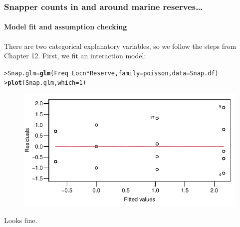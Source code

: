 \documentclass{beamer}\usepackage[]{graphicx}\usepackage[]{xcolor}
\makeatletter
\newcommand{\hlnum}[1]{\textcolor[rgb]{0.686,0.059,0.569}{#1}}%
\newcommand{\hlopt}[1]{\textcolor[rgb]{0,0,0}{#1}}%
\newcommand{\hlstd}[1]{\textcolor[rgb]{0.345,0.345,0.345}{#1}}%
\newcommand{\hlkwb}[1]{\textcolor[rgb]{0.69,0.353,0.396}{#1}}%
\newcommand{\hlkwc}[1]{\textcolor[rgb]{0.333,0.667,0.333}{#1}}%
\newcommand{\hlkwd}[1]{\textcolor[rgb]{0.737,0.353,0.396}{\textbf{#1}}}%
\newenvironment{kframe}{%
 \def\at@end@of@kframe{}%
 \ifinner\ifhmode%
  \def\at@end@of@kframe{\end{minipage}}%
  \begin{minipage}{\columnwidth}%
 \fi\fi%
 \def\FrameCommand##1{\hskip\@totalleftmargin \hskip-\fboxsep
 \colorbox{shadecolor}{##1}\hskip-\fboxsep
     \hskip-\linewidth \hskip-\@totalleftmargin \hskip\columnwidth}%
 \MakeFramed {\advance\hsize-\width
   \@totalleftmargin\z@ \linewidth\hsize
   \@setminipage}}%
 {\par\unskip\endMakeFramed%
 \at@end@of@kframe}
\newenvironment{knitrout}{}{} %
\makeatother
\begin{document}
\begin{frame}[fragile]
\frametitle{Snapper counts in and around marine reserves\ldots}
\framesubtitle{Model fit and assumption checking}
There are two categorical explanatory variables, so we follow the steps from Chapter 12. First, we fit an interaction model:
\medskip

\begin{knitrout}\scriptsize
{}\color{fgcolor}\begin{kframe}
\begin{alltt}
\hlstd{> }\hlstd{Snap.glm} \hlkwb{=} \hlkwd{glm}\hlstd{(Freq} \hlopt{~} \hlstd{Locn}\hlopt{*}\hlstd{Reserve,} \hlkwc{family} \hlstd{= poisson,} \hlkwc{data} \hlstd{= Snap.df)}
\hlstd{> }\hlkwd{plot}\hlstd{(Snap.glm,} \hlkwc{which} \hlstd{=} \hlnum{1}\hlstd{)}
\end{alltt}
\end{kframe}
\end{knitrout}



\begin{figure}
  \centering
  \includegraphics[scale=0.7]{figure/RC-H14-017}
\end{figure}

Looks fine.
\end{frame}
\end{document}
